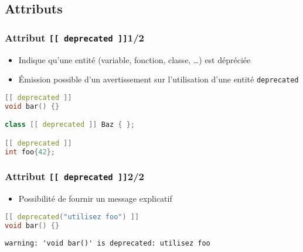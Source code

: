 \documentclass[C++.tex]{subfiles}
\begin{document}
\subsection*{Attributs}
\begin{frame}[fragile]
	\frametitle{Attribut \lstinline|[[ deprecated ]]|\titlehfill{}1/2}
	\begin{itemize}
		\item Indique qu'une entité (variable, fonction, classe, \ldots) est dépréciée
		\item Émission possible d'un avertissement sur l'utilisation d'une entité \lstinline|deprecated|

	\end{itemize}

	\begin{lstlisting}[language=C++]
[[ deprecated ]]
void bar() {}

class [[ deprecated ]] Baz { };

[[ deprecated ]]
int foo{42};\end{lstlisting}
\end{frame}

\begin{frame}[fragile]
	\frametitle{Attribut \lstinline|[[ deprecated ]]|\titlehfill{}2/2}
	\begin{itemize}
		\item Possibilité de fournir un message explicatif
	\end{itemize}

	\begin{lstlisting}[language=C++]
[[ deprecated("utilisez foo") ]]
void bar() {}\end{lstlisting}

	\begin{lstlisting}
warning: 'void bar()' is deprecated: utilisez foo\end{lstlisting}
\end{frame}
\end{document}
